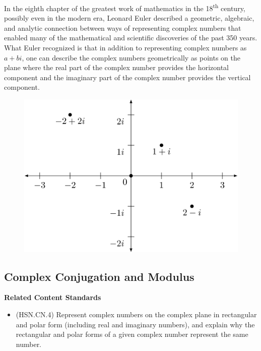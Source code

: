 \documentclass[
]{book}
\providecommand{\tightlist}{%
  \setlength{\itemsep}{0pt}\setlength{\parskip}{0pt}}
\newenvironment{standards}{}{}
\theoremstyle{definition}
\theoremstyle{definition}
\theoremstyle{definition}
\theoremstyle{definition}
\theoremstyle{remark}
\begin{document}
In the eighth chapter of the greatest work of mathematics in the 18\textsuperscript{th} century, possibly even in the modern era, Leonard Euler \citeyearpar{Euler} described a geometric, algebraic, and analytic connection between ways of representing complex numbers that enabled many of the mathematical and scientific discoveries of the past 350 years. What Euler recognized is that in addition to representing complex numbers as \(a+bi\), one can describe the complex numbers geometrically as points on the plane where the real part of the complex number provides the horizontal component and the imaginary part of the complex number provides the vertical component.

\begin{figure}

{\centering \includegraphics[width=0.6\linewidth]{tikz/complex-rectangular} 

}

\end{figure}

\hypertarget{complex-conjugation-and-modulus}{%
\subsection{Complex Conjugation and Modulus}\label{complex-conjugation-and-modulus}}

\begin{standards}

\begin{center}
\textbf{Related Content Standards}

\end{center}

\begin{itemize}
\tightlist
\item
  (HSN.CN.4) Represent complex numbers on the complex plane in rectangular and polar form (including real and imaginary numbers), and explain why the rectangular and polar forms of a given complex number represent the same number.
\end{itemize}

\end{standards}
\end{document}
